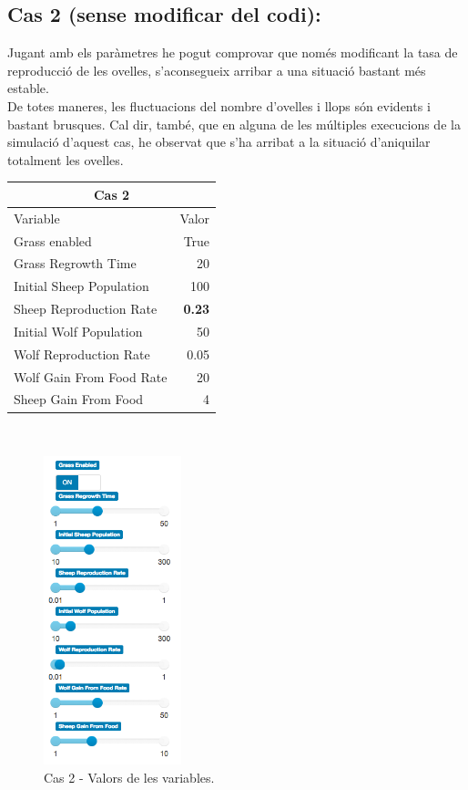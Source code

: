\documentclass{article} %
\begin{document}
{	\subsection*{Cas 2 (sense modificar del codi):}
	Jugant amb els paràmetres he pogut comprovar que només modificant la tasa de reproducció de les ovelles, s'aconsegueix arribar a una situació bastant més estable. \\

	De totes maneres, les fluctuacions del nombre d'ovelles i llops són evidents i bastant brusques. Cal dir, també, que en alguna de les múltiples execucions de la simulació d'aquest cas, he observat que s'ha arribat a la situació d'aniquilar totalment les ovelles. \\

	{\selectfont\small
	\begin{tabular}{l | r}
		\multicolumn{2}{c}{Cas 2}  \\ \hline
		Variable & Valor \\ \hline
		Grass enabled &  True  \\
		Grass Regrowth Time &  20  \\
		Initial Sheep Population &  100  \\
		Sheep Reproduction Rate &  \textbf{0.23}  \\
		Initial Wolf Population &  50  \\
		Wolf Reproduction Rate &  0.05  \\
		Wolf Gain From Food Rate &  20  \\
		Sheep Gain From Food &  4  \\
	\end{tabular}
	} \\

	\begin{figure}[H]
		\includegraphics[width=4cm]{case_2_vars}
		\centering
		\color{blue}
		\caption{Cas 2 - Valors de les variables.}\label{visina8}
	\end{figure}

}
\end{document}
